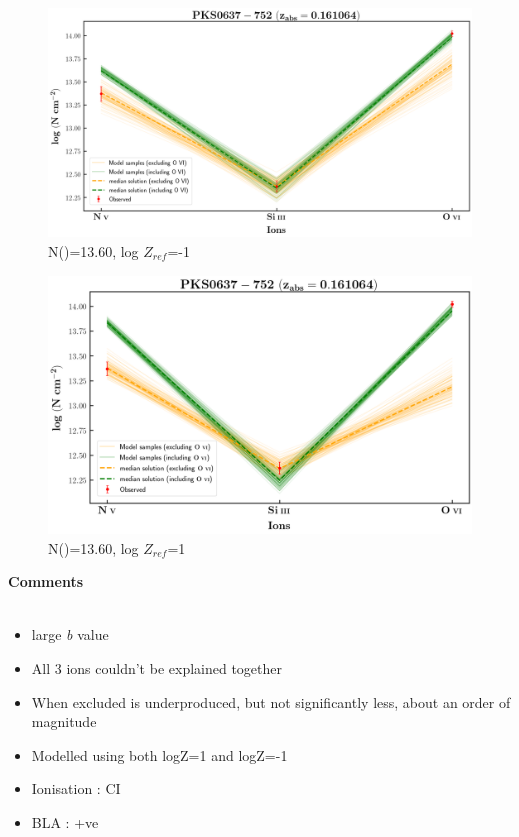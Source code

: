 \documentclass[12pt]{report}
\newcommand\ion[2]{\text{#1\,\textsc{\lowercase{#2}}}}
\begin{document}
\begin{figure}[!h]
    \centering
    \includegraphics[width=0.85\linewidth]{Ionisation-Modelling-Plots/pks0637-z=0.161064-compI_logZ=-1.png}
    \caption{N(\ion{H}{i})=13.60, log $Z_{ref}$=-1}
\end{figure}

\begin{figure}[!b]
    \centering
    \includegraphics[width=0.85\linewidth]{Ionisation-Modelling-Plots/pks0637-z=0.161064-compI_logZ=1.png}
    \caption{N(\ion{H}{i})=13.60, log $Z_{ref}$=1}
\end{figure}


\newpage

\textbf{Comments}
\\\\
\begin{itemize}
    \item large \emph{b} value
    \item All 3 ions couldn't be explained together
    \item When excluded \ion{O}{vi} is underproduced, but not significantly less, about an order of magnitude
    \item Modelled using both logZ=1 and logZ=-1 
    \item Ionisation : CI
    \item BLA : +ve
\end{itemize}
\end{document}
